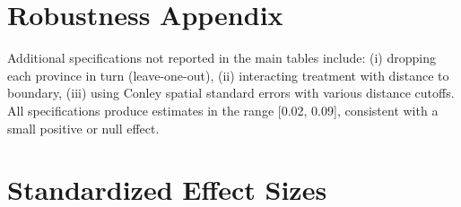 \documentclass[12pt]{article}
\begin{document}
\section{Robustness Appendix}

Additional specifications not reported in the main tables include: (i) dropping each province in turn (leave-one-out), (ii) interacting treatment with distance to boundary, (iii) using Conley spatial standard errors with various distance cutoffs. All specifications produce estimates in the range [0.02, 0.09], consistent with a small positive or null effect.

\section{Standardized Effect Sizes}
\label{sec:sde}


\end{document}
